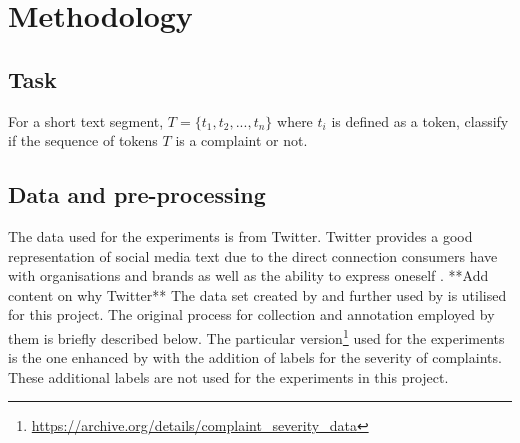\chapter{Methodology}

\section{Task}
For a short text segment, $T = \{t_1, t_2, ..., t_n\}$ where $t_i$ is defined as a token, classify if the sequence of tokens $T$ is a complaint or not.

\section{Data and pre-processing}
The data used for the experiments is from Twitter. Twitter provides a good representation of social media text due to the direct connection consumers have with organisations and brands as well as the ability to express oneself \cite{preotiuc-pietro_automatically_2019}. **Add content on why Twitter**
\newline \newline
The data set created by \cite{preotiuc-pietro_automatically_2019} and further used by \cite{jin_complaint_2020} is utilised for this project. The original process for collection and annotation employed by them is briefly described below. The particular version\footnote{\url{https://archive.org/details/complaint_severity_data}} used for the experiments is the one enhanced by \cite{jinModelingSeverityComplaints2021} with the addition of labels for the severity of complaints. These additional labels are not used for the experiments in this project.
